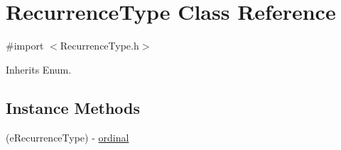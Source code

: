 \hypertarget{interface_recurrence_type}{}\section{Recurrence\+Type Class Reference}
\label{interface_recurrence_type}


{\ttfamily \#import $<$Recurrence\+Type.\+h$>$}



Inherits Enum.

\subsection*{Instance Methods}
\begin{DoxyCompactItemize}
\item 
(e\+Recurrence\+Type) -\/ \hyperlink{interface_recurrence_type_aedef69ee88200bb85d43c9cdc1569921}{ordinal}
\end{DoxyCompactItemize}
